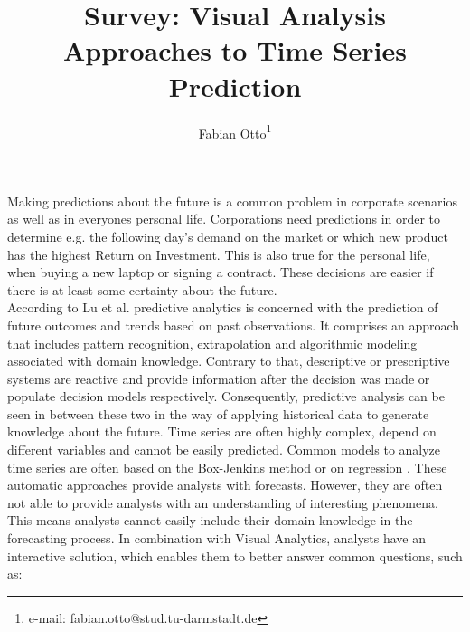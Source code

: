 \documentclass[electronic]{vgtc}             %
\title{Survey: Visual Analysis Approaches to Time Series Prediction}
\author{Fabian Otto\thanks{e-mail: fabian.otto@stud.tu-darmstadt.de}}
\affiliation{\scriptsize Technische Universit\"at Darmstadt}
\begin{document}

\maketitle

Making predictions about the future is a common problem in corporate scenarios as well as in everyones personal life. 
Corporations need predictions in order to determine e.g. the following day's demand on the market or which new product has the highest Return on Investment.
This is also true for the personal life, when buying a new laptop or signing a contract.
These decisions are easier if there is at least some certainty about the future.\\
According to Lu et al. \cite{Lu:2017} predictive analytics is concerned with the prediction of future outcomes and trends based on past observations. 
It comprises an approach that includes pattern recognition, extrapolation and algorithmic modeling associated with domain knowledge.
Contrary to that, descriptive or prescriptive systems are reactive and provide information after the decision was made or populate decision models respectively.
Consequently, predictive analysis can be seen in between these two in the way of applying historical data to generate knowledge about the future.
Time series are often highly complex, depend on different variables and cannot be easily predicted. 
Common models to analyze time series are often based on the Box-Jenkins method \cite{box:2015} or on regression \cite{draper:2014}.
These automatic approaches provide analysts with forecasts.
However, they are often not able to provide analysts with an understanding of interesting phenomena.
This means analysts cannot easily include their domain knowledge in the forecasting process.
In combination with Visual Analytics, analysts have an interactive solution, which enables them to better answer common questions, such as: 
\end{document}
